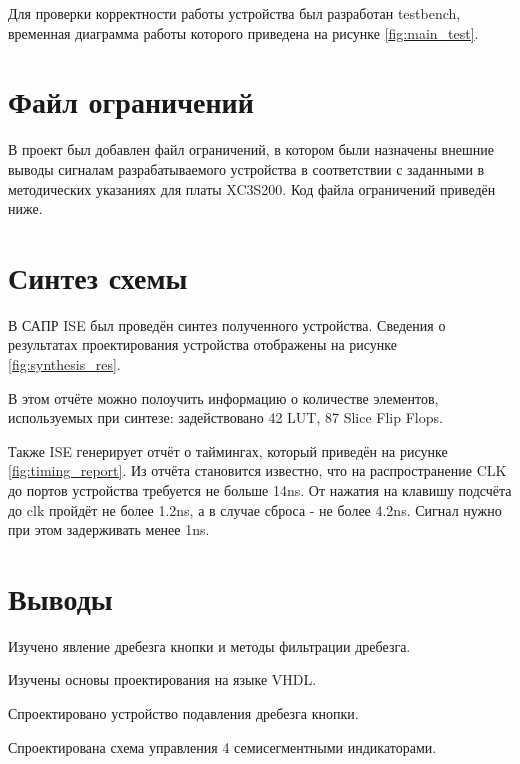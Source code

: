 \documentclass[a4paper, 14pt]{extarticle}
\begin{document}
    Для проверки корректности работы устройства был разработан testbench, временная диаграмма работы которого приведена на рисунке \ref{fig:main_test}.

    \section{Файл ограничений}
    В проект был добавлен файл ограничений, в котором были назначены внешние выводы сигналам разрабатываемого устройства в соответствии с заданными в методических указаниях для платы XC3S200.
    Код файла ограничений приведён ниже.

    \section{Синтез схемы}
    В САПР ISE был проведён синтез полученного устройства. Сведения о результатах проектирования устройства отображены на рисунке \ref{fig:synthesis_res}. 

    В этом отчёте можно полоучить информацию о количестве элементов, используемых при синтезе:
    задействовано 42 LUT, 87 Slice Flip Flops.

    Также ISE генерирует отчёт о таймингах, который приведён на рисунке \ref{fig:timing_report}.
    Из отчёта становится известно, что на распространение CLK до портов устройства требуется не больше 14ns. От нажатия на клавишу подсчёта до clk пройдёт не более 1.2ns, а в случае сброса - не более 4.2ns. Сигнал нужно при этом задерживать менее 1ns.

    \pagebreak
    \section*{Выводы}
    Изучено явление дребезга кнопки и методы фильтрации дребезга.
    
    Изучены основы проектирования на языке VHDL.

    Спроектировано устройство подавления дребезга кнопки.

    Спроектирована схема управления 4 семисегментными индикаторами.
\end{document}
